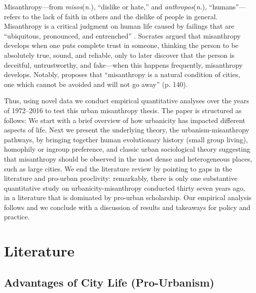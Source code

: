 \documentclass[11pt, letterpaper]{article}
\begin{document}
\begin{spacing}{1.4}
Misanthropy---from \textit{misos}(\textit{n.}), ``dislike or hate,'' and \textit{anthropos}(\textit{n.}), ``humans''---refers to the lack of faith in others and the dislike of people in general.   
%
Misanthropy is a critical judgment on human life caused by failings that are ``ubiquitous, pronounced, and entrenched'' \citep[p. 7]{cooper2018animals}.
Socrates \citep[cited in][]{melgar13} argued
that misanthropy develops when one puts complete trust in someone, thinking the
person to be absolutely true, sound, and reliable, only to later discover that
the person is deceitful, untrustworthy, and fake---when this happens frequently,
misanthropy develops.
 Notably, \citet[]{thrift05} proposes that ``misanthropy is a natural
condition of cities, one which cannot be avoided and will not go away''
(p. 140). %
 
Thus, using novel data we conduct empirical quantitative analyses over the years of 1972--2016 to test this urban misanthropy thesis. The paper is structured as follows: We start with a brief overview of how urbanicity has impacted different aspects of life. Next we present the underlying theory, the urbanism-misanthropy pathways, by bringing together human evolutionary history (small group living), homophily or ingroup preference, and classic urban sociological theory suggesting that
misanthropy should be observed in the most dense and heterogeneous places, such as large cities. We end the literature review by pointing to gaps in the literature and pro-urban proclivity: remarkably, there is only one substantive quantitative study on urbanicity-misanthropy conducted thirty seven years ago, in a literature that is dominated by pro-urban scholarship. %
 Our
empirical analysis follows and we conclude with a discussion of results and %
 takeaways for policy and practice.
   

\section*{Literature}

\subsection*{Advantages of City Life (Pro-Urbanism)}    
    

\end{spacing}
\end{document}
